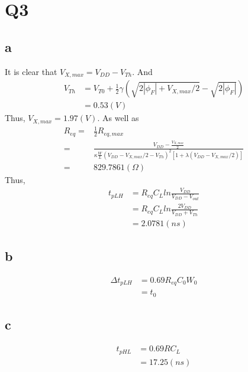 \documentclass[a4paper,10pt]{article}
\begin{document}
\section*{Q3}
\subsection*{a}
It is clear that \begin{math}V_{X, max} = V_{DD} - V_{Th}\end{math}. And
\begin{equation}
 \begin{split}
  V_{Th} &= V_{T0} + \frac{1}{2}\gamma(\sqrt{2|\phi_F| + V_{X, max}/2} -\sqrt{2|\phi_F|})\\
  &=0.53(V)
 \end{split}
\end{equation}
Thus, \begin{math}V_{X, max}=1.97(V)\end{math}. As well as
\begin{equation}
 \begin{split}
  R_{eq}=& \frac{1}{2} R_{eq, max}\\
  =& \frac{V_{DD}-\frac{V_{X, max}}{2}}{\kappa\frac{W}{L}(V_{DD}-V_{X,max}/2 -V_{Th})^2 [1+\lambda(V_{DD}-V_{X, max}/2)]}\\
  =& 829.7861(\Omega)
 \end{split}
\end{equation}
Thus,
\begin{equation}
\begin{split}
t_{pLH} &= R_{eq}C_L ln\frac{V_{DD}}{V_{DD} - V_{out}}\\
&= R_{eq}C_L ln\frac{2V_{DD}}{V_{DD} + V_{Th}}\\
&= 2.0781(ns)
\end{split}
\end{equation}
\subsection*{b}
\begin{equation}
\begin{split}
\Delta t_{pLH} &= 0.69R_{eq}C_0 W_0\\
&= t_0
\end{split}
\end{equation}
\subsection*{c}
\begin{equation}
\begin{split}
t_{pHL} &= 0.69RC_L\\
& = 17.25 (ns)
\end{split}
\end{equation}
\end{document}
